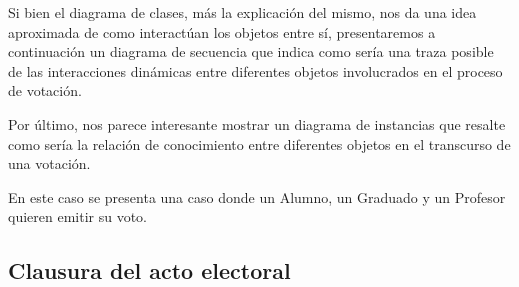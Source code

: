 \bigskip

Si bien el diagrama de clases, m\'as la explicaci\'on del mismo, nos da una idea aproximada de como interact\'uan los objetos entre s\'i, presentaremos a continuaci\'on un diagrama de secuencia que indica como ser\'ia una traza posible de las interacciones din\'amicas entre diferentes objetos involucrados en el proceso de votaci\'on.


\bigskip

Por \'ultimo, nos parece interesante mostrar un diagrama de instancias que resalte como ser\'ia la relaci\'on de conocimiento entre diferentes objetos en el transcurso de una votaci\'on.

En este caso se presenta una caso donde un Alumno, un Graduado y un Profesor quieren emitir su voto.




\subsection{Clausura del acto electoral}

